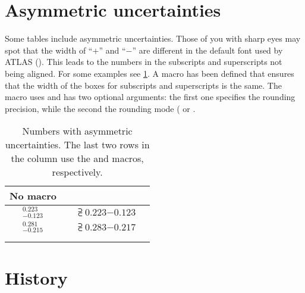 \documentclass[REPORT=false, UKenglish]{atlasdoc}
\begin{document}
\section{Asymmetric uncertainties}

Some tables include asymmetric uncertainties.
Those of you with sharp eyes may spot that the width of \enquote{\(+\)} and \enquote{\(-\)}
are different in the default font used by ATLAS ().
This leads to the numbers in the subscripts and superscripts not being aligned.
For some examples see \cref{tab:asym}.
A macro  has been defined that ensures that the width
of the boxes for subscripts and superscripts is the same.
The macro  uses  and has two optional arguments:
the first one specifies the rounding precision, while the second the rounding mode
( or .

\begin{table}[htbp]
\begin{tcblisting}{}
  \caption{Numbers with asymmetric uncertainties.
    The last two rows in the  column
    use the  and  macros, respectively.}%
  \label{tab:asym}
  \centering
  \renewcommand{\arraystretch}{1.4}
  \begin{tabular}{cccc}
    \toprule
    No macro & \Macro{numpmerr} & \Macro{supsub} & \Macro{numpmerrx} \\
    \midrule
    \(^{\num{+0.223}}_{\num{-0.123}}\) & \numpmerr{+0.223}{-0.123}{3} &
    \(\supsub{\num{+0.223}}{\num{-0.123}}\) & \numpmerrx{+0.223}{-0.123} \\
    \(^{\num{+0.281}}_{\num{-0.215}}\) & \numpmerr{+0.282}{-0.216}{3} &
    \(\supsub{\num{+0.283}}{\num{-0.217}}\) & \numpmerrx{+0.284}{-0.218} \\
    & \numpmRP{+1.284}{-2.214}{2} & & \numpmerrx[2][places]{+1.284}{-2.214} \\
    & \numpmRF{+1.284}{-2.214}{2} & & \numpmerrx[2][figures]{+1.284}{-2.214}
  \end{tabular}
\end{tcblisting}
\end{table}

\clearpage
\section*{History}
\end{document}
